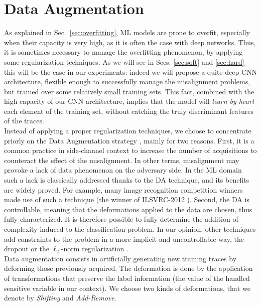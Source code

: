 \section{Data Augmentation}\label{sec:DA}
As explained in Sec.~\ref{sec:overfitting}, ML models are prone to overfit, especially when their capacity is very high, as it is often the case with deep networks. Thus, it is sometimes necessary to manage the overfitting phenomenon, by applying some regularization techniques. As we will see in Secs. \ref{sec:soft} and \ref{sec:hard} this will be the case in our experiments: indeed we will propose a quite deep CNN architecture,  flexible enough to successfully manage the misalignment problems, but trained over some relatively small training sets. This fact, combined with the high capacity of our CNN architecture, implies that the model will \emph{learn by heart} each element of the training set, without catching the truly discriminant features of the traces.\\

Instead of applying a proper regularization techniques, we choose to concentrate priorly on the Data Augmentation strategy \cite{simard2003best}, mainly for two reasons. First, it is a common practice in side-channel context to increase the number of acquisitions to counteract the effect of the misalignment. In other terms, misalignment may provoke a lack of data phenomenon on the adversary side. In the ML domain such a lack is classically addressed thanks to the DA technique, and its benefits are widely proved. For example, many image recognition competition winners made use of such a technique (\eg the winner of ILSVRC-2012 \cite{KSH12}). Second, the DA is controllable, meaning that the deformations applied to the data are chosen, thus fully characterized. It is therefore possible to fully determine the addition of complexity induced to the classification problem. In our opinion, other techniques add constraints to the problem in a more implicit and uncontrollable way, \eg the dropout \cite{HSKSS12}  or the $\ell_2$-norm regularization \cite{christopher2006pattern}.\\

Data augmentation consists in artificially generating new training traces by deforming those previously acquired. The deformation is done by the application of transformations that preserve the  label information (\ie the value of the handled sensitive variable in our context). We choose two kinds of deformations, that we denote by \emph{Shifting} and \emph{Add-Remove}. 

